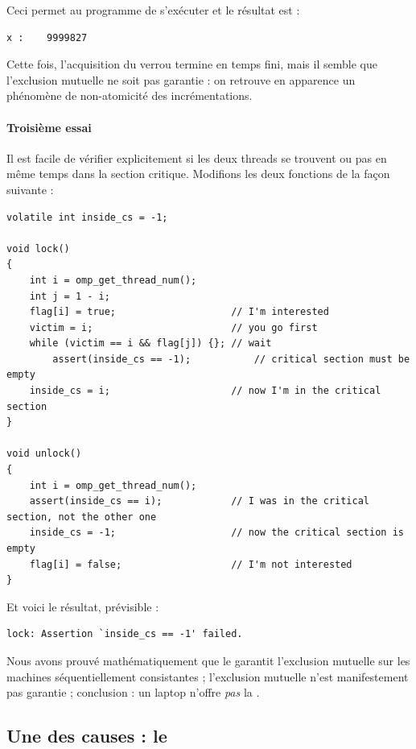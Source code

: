 Ceci permet au programme de s'exécuter et le résultat est :
\begin{verbatim}
x :    9999827
\end{verbatim}

Cette fois, l'acquisition du verrou termine en temps fini, mais il semble que
l'exclusion mutuelle ne soit pas garantie : on retrouve en apparence un
phénomène de non-atomicité des incrémentations.

\paragraph{Troisième essai} Il est facile de vérifier explicitement si les deux
threads se trouvent ou pas en même temps dans la section critique. Modifions les
deux fonctions de la façon suivante :
\begin{myfilet}
\begin{verbatim}
volatile int inside_cs = -1;

void lock() 
{
	int i = omp_get_thread_num();
	int j = 1 - i;
	flag[i] = true;                    // I'm interested
	victim = i;                        // you go first
	while (victim == i && flag[j]) {}; // wait
        assert(inside_cs == -1);           // critical section must be empty
	inside_cs = i;                     // now I'm in the critical section
}

void unlock() 
{
	int i = omp_get_thread_num();
	assert(inside_cs == i);            // I was in the critical section, not the other one
	inside_cs = -1;                    // now the critical section is empty
	flag[i] = false;                   // I'm not interested
}
\end{verbatim}
\end{myfilet}

Et voici le résultat, prévisible :
\begin{verbatim}
lock: Assertion `inside_cs == -1' failed.
\end{verbatim}

Nous avons prouvé mathématiquement que le  garantit
l'exclusion mutuelle sur les machines séquentiellement consistantes ;
l'exclusion mutuelle n'est manifestement pas garantie ; conclusion : un laptop
 n'offre \emph{pas} la .

\subsection{Une des causes : le \og {}\fg}

